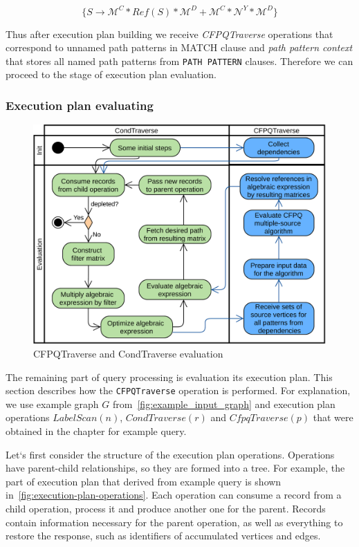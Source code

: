 $$\{ S \xrightarrow{} \mathcal{M}^C * Ref(S) * \mathcal{M}^D + \mathcal{M}^C * \mathcal{N}^Y * \mathcal{M}^D \}$$

Thus after execution plan building we receive \textit{CFPQTraverse} operations that correspond to unnamed path patterns in MATCH clause and \textit{path pattern context} that stores all named path patterns from \lstinline{PATH PATTERN} clauses. Therefore we can proceed to the stage of execution plan evaluation.


\subsubsection{Execution plan evaluating}
\label{subsubsec:execution-plan-evaluating}

\begin{figure}[h!]
  \centering
  \includegraphics[width=\linewidth]{pictures/execution-plan-evaluation.png}
  \caption{CFPQTraverse and CondTraverse evaluation}
  \label{fig:execution-plan-evaluation}
\end{figure}

The remaining part of query processing is evaluation its execution plan. This section describes how the \lstinline{CFPQTraverse} operation is performed. For explanation, we use example graph $G$ from~\autoref{fig:example_input_graph} and execution plan operations $LabelScan(n)$, $CondTraverse(r)$ and $CfpqTraverse(p)$ that were obtained in the chapter for example query.

Let`s first consider the structure of the execution plan operations. Operations have parent-child relationships, so they are formed into a tree. For example, the part of execution plan that derived from example query is shown in~\autoref{fig:execution-plan-operations}. Each operation can consume a record from a child operation, process it and produce another one for the parent. Records contain information necessary for the parent operation, as well as everything to restore the response, such as identifiers of accumulated vertices and edges.

